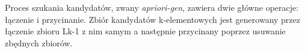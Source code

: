 Proces szukania kandydatów, zwany \emph{apriori-gen}, zawiera dwie główne operacje: łączenie i przycinanie. Zbiór kandydatów k-elementowych jest generowany przez łączenie zbioru Lk-1 z nim samym a następnie przycinany poprzez usuwanie zbędnych zbiorów.



 






